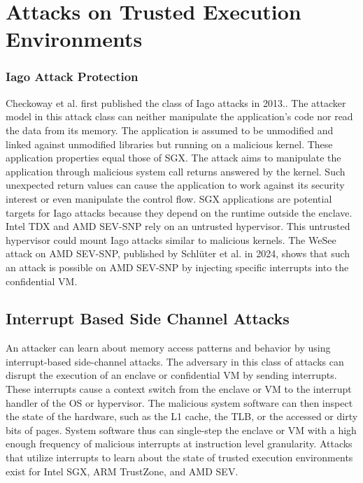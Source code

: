 \section{Attacks on Trusted Execution Environments}

\subsubsection{Iago Attack Protection}
\label{sec:20:iago}
Checkoway et al. first published the class of Iago attacks in
2013.\cite{checkoway2013iago}. The attacker model in this attack class can
neither manipulate the application's code nor read the data from its memory. The
application is assumed to be unmodified and linked against unmodified libraries
but running on a malicious kernel. These application properties equal those of
SGX. The attack aims to manipulate the application through malicious system call
returns answered by the kernel. Such unexpected return values can cause the
application to work against its security interest or even manipulate the control
flow. SGX applications are potential targets for Iago attacks because they
depend on the runtime outside the enclave. Intel TDX and AMD SEV-SNP rely on an
untrusted hypervisor.\cite{tdx_whitepaper,kaplan_amd_2020} This untrusted
hypervisor could mount Iago attacks similar to malicious kernels. The WeSee
attack on AMD SEV-SNP, published by Schlüter et al. in 2024, shows that such an
attack is possible on AMD SEV-SNP by injecting specific interrupts into the
confidential VM.\cite{schluter2024wesee}\\

\subsection{Interrupt Based Side Channel Attacks}
\label{sec:20:interrupt_sca}
An attacker can learn about memory access patterns and behavior by using
interrupt-based side-channel attacks. The adversary in this class of attacks can
disrupt the execution of an enclave or confidential VM by sending interrupts.
These interrupts cause a context switch from the enclave or VM to the interrupt
handler of the OS or hypervisor. The malicious system software can then inspect
the state of the hardware, such as the L1 cache, the TLB, or the accessed or
dirty bits of pages. System software thus can single-step the enclave or VM with
a high enough frequency of malicious interrupts at instruction level
granularity. Attacks that utilize interrupts to learn about the state of trusted
execution environments exist for Intel SGX, ARM TrustZone, and AMD
SEV.\cite{van2017sgx, kou2021load, wilke2023sev}\\



